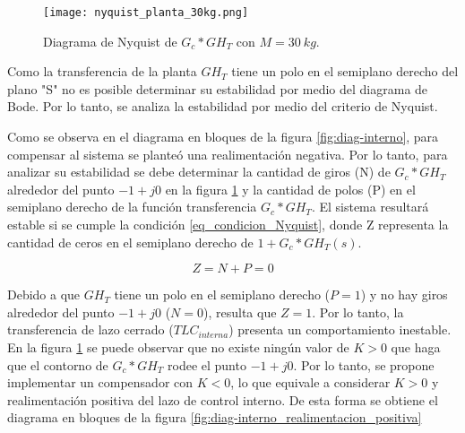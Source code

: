 \begin{figure}[H]
	\centering
	\texttt{[image: nyquist\_planta\_30kg.png]}
	\caption{Diagrama de Nyquist de $G_c*GH_T$ con $M=30\:kg$.}
	\label{fig:Diag_Nyquist_lazo_abierto_30kg}
\end{figure}



Como la transferencia de la planta $GH_T$ tiene un polo en el semiplano derecho del plano "S" no es posible determinar su estabilidad por medio del diagrama de Bode. Por lo tanto, se analiza la estabilidad por medio del criterio de Nyquist.

Como se observa en el diagrama en bloques de la figura \ref{fig:diag-interno}, para compensar al sistema se planteó una realimentación negativa. Por lo tanto, para analizar su estabilidad  se debe determinar la cantidad de giros (N) de $G_c*GH_T$ alrededor del punto $-1+j0$ en la figura \ref{fig:Diag_Nyquist_lazo_abierto_30kg} y la cantidad de polos (P) en el semiplano derecho de la función transferencia $G_c*GH_T$. El sistema resultará estable si se cumple la condición \ref{eq_condicion_Nyquist}, donde Z representa la cantidad de ceros en el semiplano derecho de $1+G_c*GH_T(s)$.

\begin{equation}\label{eq_condicion_Nyquist}
	Z=N+P=0
\end{equation}


Debido a que $GH_T$ tiene un polo en el semiplano derecho ($P=1$) y no hay giros alrededor del punto $-1+j0$ ($N=0$), resulta que $Z=1$. Por lo tanto, la transferencia de lazo cerrado ($TLC_{interna}$) presenta un comportamiento inestable. En la figura \ref{fig:Diag_Nyquist_lazo_abierto_30kg} se puede observar que no existe ningún valor de $K>0$ que haga que el contorno de $G_c*GH_T$ rodee el punto $-1+j0$. Por lo tanto, se propone implementar un compensador con $K<0$, lo que equivale a considerar $K>0$ y realimentación positiva del lazo de control interno. De esta forma se obtiene el diagrama en bloques de la figura \ref{fig:diag-interno_realimentacion_positiva}


